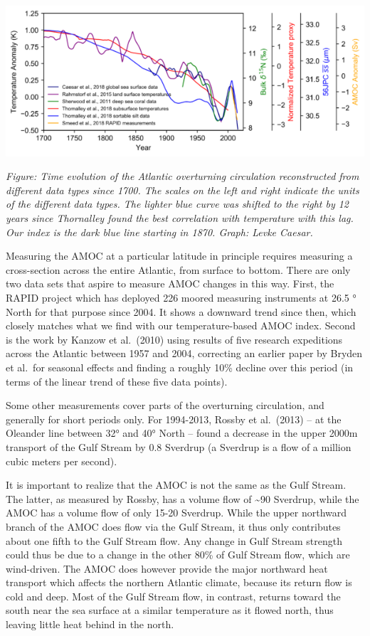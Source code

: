 \documentclass[
]{book}
\begin{document}
\includegraphics{fig/AMOC-estimates.png}

\emph{Figure: Time evolution of the Atlantic overturning circulation reconstructed from different data types since 1700. The scales on the left and right indicate the units of the different data types. The lighter blue curve was shifted to the right by 12 years since Thornalley found the best correlation with temperature with this lag. Our index is the dark blue line starting in 1870. Graph: Levke Caesar.}

Measuring the AMOC at a particular latitude in principle requires measuring a cross-section across the entire Atlantic, from surface to bottom. There are only two data sets that aspire to measure AMOC changes in this way. First, the RAPID project which has deployed 226 moored measuring instruments at 26.5 ° North for that purpose since 2004. It shows a downward trend since then, which closely matches what we find with our temperature-based AMOC index. Second is the work by Kanzow et al.~(2010) using results of five research expeditions across the Atlantic between 1957 and 2004, correcting an earlier paper by Bryden et al.~for seasonal effects and finding a roughly 10\% decline over this period (in terms of the linear trend of these five data points).

Some other measurements cover parts of the overturning circulation, and generally for short periods only. For 1994-2013, Rossby et al.~(2013) -- at the Oleander line between 32° and 40° North -- found a decrease in the upper 2000m transport of the Gulf Stream by 0.8 Sverdrup (a Sverdrup is a flow of a million cubic meters per second).

It is important to realize that the AMOC is not the same as the Gulf Stream. The latter, as measured by Rossby, has a volume flow of \textasciitilde90 Sverdrup, while the AMOC has a volume flow of only 15-20 Sverdrup. While the upper northward branch of the AMOC does flow via the Gulf Stream, it thus only contributes about one fifth to the Gulf Stream flow. Any change in Gulf Stream strength could thus be due to a change in the other 80\% of Gulf Stream flow, which are wind-driven. The AMOC does however provide the major northward heat transport which affects the northern Atlantic climate, because its return flow is cold and deep. Most of the Gulf Stream flow, in contrast, returns toward the south near the sea surface at a similar temperature as it flowed north, thus leaving little heat behind in the north.
\end{document}
